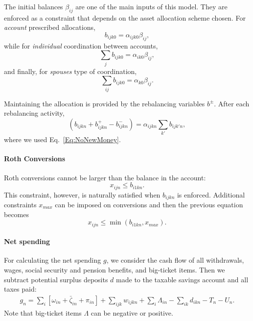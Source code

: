 \documentclass{article}[fleqn,12pt]
\begin{document}
	The initial balances $\beta_{ij}$ are one of the main inputs of this model. They are
	enforced as a constraint that depends on the asset allocation scheme chosen.
	For {\em account} prescribed allocations,
	\begin{equation}
		\label{Eq:AccountCoord}
		b_{ijk0} =  \alpha_{ijk0}\beta_{ij},
	\end{equation}
	while for {\em individual} coordination between accounts,
	\begin{equation}
		\sum_j b_{ijk0} = \alpha_{ik0}\beta_{ij},
	\end{equation}
	and finally, for {\em spouses} type of coordination,
	\begin{equation}
		\label{Eq:SpouseCoord}
		\sum_{ij} b_{ijk0} = \alpha_{k0}\beta_{ij}.
	\end{equation}

	Maintaining the allocation is provided by the rebalancing variables $b^\pm$. After each
	rebalancing activity,
	\begin{equation}
		\label{Eq:Rebalance}
		(b_{ijkn} + b^+_{ijkn} - b^-_{ijkn}) = \alpha_{ijkn}\sum_{k'} b_{ijk'n},
	\end{equation}
	where we used Eq.~\ref{Eq:NoNewMoney}.

\paragraph*{Roth Conversions}
	Roth conversions cannot be larger than the balance in the account:
	\begin{equation}
		x_{ijn} \le b_{i1kn}.
	\end{equation}
	This constraint, however, is naturally satisfied when $b_{ijkn}$ is enforced.
	Additional constraints $x_{max}$ can be imposed on conversions and then the previous equation
	becomes
	\begin{equation}
		x_{ijn} \le \min(b_{i1kn}, x_{max}).
	\end{equation}

\paragraph*{Net spending}
	For calculating the net spending $g$, we consider the cash flow of all withdrawals,
	wages, social security and pension benefits, and big-ticket items. 
	Then we subtract potential surplus deposits $d$ made to the taxable savings account
	and all taxes paid:
	\begin{eqnarray}
		g_n = \sum_i [\omega_{in} + \bar{\zeta}_{in} + \pi_{in} ] 
		+ \sum_{ijk} w_{ijkn} + \sum_i \Lambda_{in} - \sum_{ik}d_{ikn}
		- T_n - U_n.
	\end{eqnarray}
	Note that big-ticket items $\Lambda$ can be negative or positive.
\end{document}
